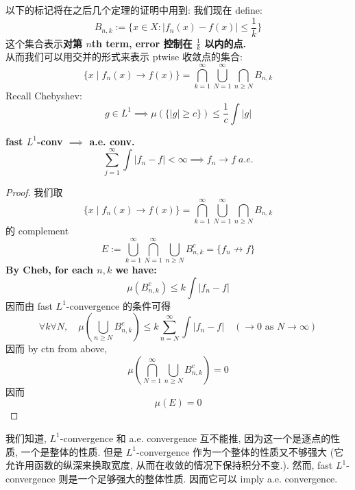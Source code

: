\documentclass[lang=cn,11pt]{elegantbook}
\begin{document}
以下的标记将在之后几个定理的证明中用到:
我们现在 define:
\[B_{n,k} := \{  x\in X  :  | f_n(x) -f(x)| \leq \frac{1}{k}   \}\]
这个集合表示\textbf{对第 $n$th term, error 控制在 $\frac{1}{k}$ 以内的点.}\\
从而我们可以用交并的形式来表示 ptwise 收敛点的集合:
\[
\{ x \mid f_n(x) \rightarrow f(x)\} = \bigcap_{k=1}^\infty \bigcup_{N=1}^\infty \bigcap_{n \geq N} B_{n,k}
\]
Recall Chebyshev:
\[
g \in L^1 \implies \mu(\{ |g| \geq c\}) \leq \frac{1}{c} \int |g|
\]


\begin{proposition}{\textbf{fast $L^1$-conv $\implies$ a.e. conv.}}
\[
\sum_{j=1}^\infty \int  |f_n-f| < \infty \implies f_n\rightarrow f \;a.e.
\]
\end{proposition}

\begin{proof}
我们取\[
\{ x \mid f_n(x) \rightarrow f(x) \}= \bigcap_{k=1}^\infty \bigcup_{N=1}^\infty \bigcap_{n \geq N} B_{n,k}\] 的 complement
\[E := \bigcup_{k=1}^\infty \bigcap_{N=1}^\infty \bigcup_{n \geq N} B_{n,k}^c = \{f_n \not\rightarrow f\}\]\textbf{By Cheb, for each $n,k$ we have:}\[ \mu(B_{n,k}^c)  \leq k \int |f_n-f|\]
因而由 fast $L^1$-convergence 的条件可得 \[ \forall k \forall N ,\quad  \mu(\bigcup_{n\geq N} B_{n,k}^c) \leq k \sum_{n=N}^\infty \int |f_n-f|  \quad  (\rightarrow 0 \text{ as $N\rightarrow \infty$})\]因而 by ctn from above, \[ \mu (\bigcap_{N=1}^\infty\bigcup_{n\geq N} B_{n,k}^c)  =0\]
因而
\[\mu(E) = 0\]
\end{proof}
\begin{remark}
    我们知道, $L^1$-convergence 和 a.e. convergence 互不能推, 因为这一个是逐点的性质, 一个是整体的性质. 但是 $L^1$-convergence 作为一个整体的性质又不够强大 (它允许用函数的纵深来换取宽度, 从而在收敛的情况下保持积分不变.). 然而, fast $L^1$-convergence 则是一个足够强大的整体性质. 因而它可以 imply a.e. convergence. 
\end{remark}
\end{document}
